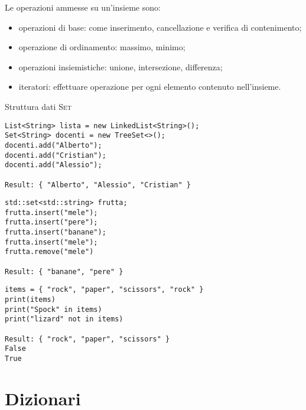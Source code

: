 Le operazioni ammesse su un'insieme sono:
\begin{itemize}
	\item operazioni di base: come inserimento, cancellazione e verifica di contenimento;
	\item operazione di ordinamento: massimo, minimo;
	\item operazioni insiemistiche: unione, intersezione, differenza;
	\item iteratori: effettuare operazione per ogni elemento contenuto nell'insieme.
\end{itemize}

\begin{algorithm}[H]
	\caption*{Struttura dati \textsc{Set}}
	
\end{algorithm}

\begin{code}
\begin{verbatim}
List<String> lista = new LinkedList<String>();
Set<String> docenti = new TreeSet<>();
docenti.add("Alberto");
docenti.add("Cristian");
docenti.add("Alessio");

Result: { "Alberto", "Alessio", "Cristian" }
\end{verbatim}
\end{code}

\begin{code}
\begin{verbatim}
std::set<std::string> frutta;
frutta.insert("mele");
frutta.insert("pere");
frutta.insert("banane");
frutta.insert("mele");
frutta.remove("mele")

Result: { "banane", "pere" }
\end{verbatim}
\end{code}

\begin{code}
\begin{verbatim}
items = { "rock", "paper", "scissors", "rock" }
print(items)
print("Spock" in items)
print("lizard" not in items)

Result: { "rock", "paper", "scissors" }
False
True
\end{verbatim}
\end{code}

\section{Dizionari}

